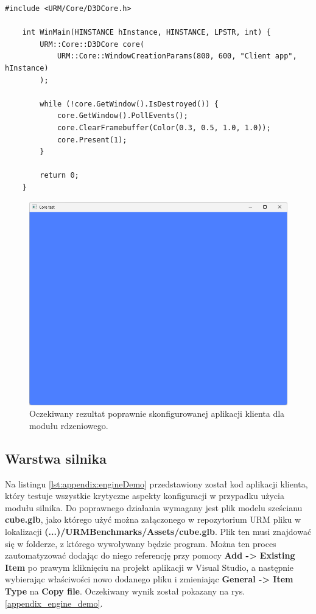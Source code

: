 \begin{lstlisting}[caption={Aplikacja przykładowa wykorzystująca interfejs modułu rdzeniowego}, label={lst:appendix:coreDemo}]
	#include <URM/Core/D3DCore.h>
	
	int WinMain(HINSTANCE hInstance, HINSTANCE, LPSTR, int) {
		URM::Core::D3DCore core(
			URM::Core::WindowCreationParams(800, 600, "Client app", hInstance)
		);
		
		while (!core.GetWindow().IsDestroyed()) {
			core.GetWindow().PollEvents();
			core.ClearFramebuffer(Color(0.3, 0.5, 1.0, 1.0));
			core.Present(1);
		}
		
		return 0;
	}
\end{lstlisting}

\begin{figure}[h!]
	\centering
	\includegraphics[width=\textwidth]{images/appendix_core_demo.png}
	\caption{Oczekiwany rezultat poprawnie skonfigurowanej aplikacji klienta dla modułu rdzeniowego.}
	\label{appendix_core_demo}
\end{figure}

\vfill
\clearpage

\subsection*{Warstwa silnika}
Na listingu \ref{lst:appendix:engineDemo} przedstawiony został kod aplikacji klienta, który testuje wszystkie krytyczne aspekty konfiguracji w przypadku użycia modułu silnika. Do poprawnego działania wymagany jest plik modelu sześcianu \textbf{cube.glb}, jako którego użyć można załączonego w repozytorium URM \cite{GitHub:Minik:MasterThesisUniversalRenderingModuleD3D11} pliku w lokalizacji \textbf{(...)/URMBenchmarks/Assets/cube.glb}. Plik ten musi znajdować się w folderze, z którego wywoływany będzie program. Można ten proces zautomatyzować dodając do niego referencję przy pomocy \textbf{Add -> Existing Item} po prawym kliknięciu na projekt aplikacji w Visual Studio, a następnie wybierając właściwości nowo dodanego pliku i zmieniając \textbf{General -> Item Type} na \textbf{Copy file}. Oczekiwany wynik został pokazany na rys. \ref{appendix_engine_demo}.

